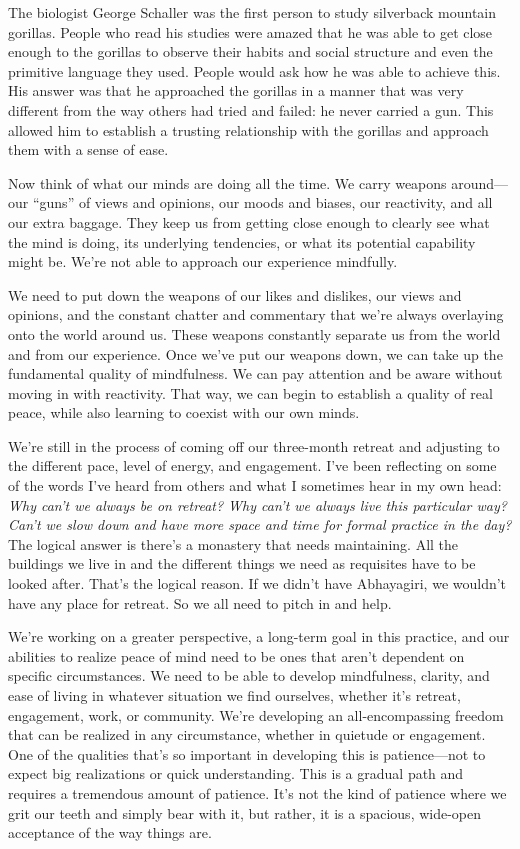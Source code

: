 The biologist George Schaller was the first person to study silverback 
mountain gorillas. People who read his studies were amazed that he was 
able to get close enough to the gorillas to observe their habits and 
social structure and even the primitive language they used. People 
would ask how he was able to achieve this. His answer was that he 
approached the gorillas in a manner that was very different from the 
way others had tried and failed: he never carried a gun. This allowed 
him to establish a trusting relationship with the gorillas and approach 
them with a sense of ease.

Now think of what our minds are doing all the time. We carry weapons 
around---our ``guns'' of views and opinions, our moods and biases, our 
reactivity, and all our extra baggage. They keep us from getting close 
enough to clearly see what the mind is doing, its underlying 
tendencies, or what its potential capability might be. We're not able 
to approach our experience mindfully.

We need to put down the weapons of our likes and dislikes, our views 
and opinions, and the constant chatter and commentary that we're always 
overlaying onto the world around us. These weapons constantly separate 
us from the world and from our experience. Once we've put our weapons 
down, we can take up the fundamental quality of mindfulness. We can pay 
attention and be aware without moving in with reactivity. That way, we 
can begin to establish a quality of real peace, while also learning to 
coexist with our own minds.


We're still in the process of coming off our three-month retreat and 
adjusting to the different pace, level of energy, and engagement. I've 
been reflecting on some of the words I've heard from others and what I 
sometimes hear in my own head: \emph{Why can't we always be on retreat? 
Why can't we always live this particular way? Can't we slow down and 
have more space and time for formal practice in the day?} The logical 
answer is there's a monastery that needs maintaining. All the buildings 
we live in and the different things we need as requisites have to be 
looked after. That's the logical reason. If we didn't have Abhayagiri, 
we wouldn't have any place for retreat. So we all need to pitch in and 
help.

We're working on a greater perspective, a long-term goal in this 
practice, and our abilities to realize peace of mind need to be ones 
that aren't dependent on specific circumstances. We need to be able to 
develop mindfulness, clarity, and ease of living in whatever situation 
we find ourselves, whether it's retreat, engagement, work, or 
community. We're developing an all-encompassing freedom that can be 
realized in any circumstance, whether in quietude or engagement. One of 
the qualities that's so important in developing this is patience---not 
to expect big realizations or quick understanding. This is a gradual 
path and requires a tremendous amount of patience. It's not the kind of 
patience where we grit our teeth and simply bear with it, but rather, 
it is a spacious, wide-open acceptance of the way things are.

